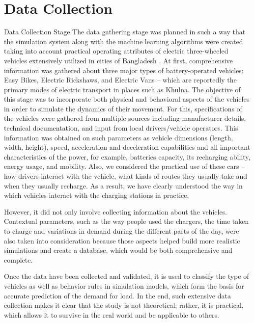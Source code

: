 \documentclass{thesis-library}
\begin{document}
\section{Data Collection}
 
Data Collection Stage
The data gathering stage was planned in such a way that the simulation system along with the machine learning algorithms were created taking into account practical operating attributes of electric three-wheeled vehicles extensively utilized in cities of Bangladesh \cite{doley2024sustainability}. At first, comprehensive information was gathered about three major types of battery-operated vehicles: Easy Bikes, Electric Rickshaws, and Electric Vans – which are reportedly the primary modes of electric transport in places such as Khulna. The objective of this stage was to incorporate both physical and behavioral aspects of the vehicles in order to simulate the dynamics of their movement. For this, specifications of the vehicles were gathered from multiple sources including manufacturer details, technical documentation, and input from local drivers/vehicle operators.
This information was obtained on such parameters as vehicle dimensions (length, width, height), speed, acceleration and deceleration capabilities and all important characteristics of the power, for example, batteries capacity, its recharging ability, energy usage, and mobility. Also, we considered the practical use of these cars – how drivers interact with the vehicle, what kinds of routes they usually take and when they usually recharge. As a result, we have clearly understood the way in which vehicles interact with the charging stations in practice.

However, it did not only involve collecting information about the vehicles. Contextual parameters, such as the way people used the chargers, the time taken to charge and variations in demand during the different parts of the day, were also taken into consideration because those aspects helped build more realistic simulations and create a database, which would be both comprehensive and complete.

Once the data have been collected and validated, it is used to classify the type of vehicles as well as behavior rules in simulation models, which form the basis for accurate prediction of the demand for load. In the end, such extensive data collection makes it clear that the study is not theoretical; rather, it is practical, which allows it to survive in the real world and be applicable to others.
\end{document}
